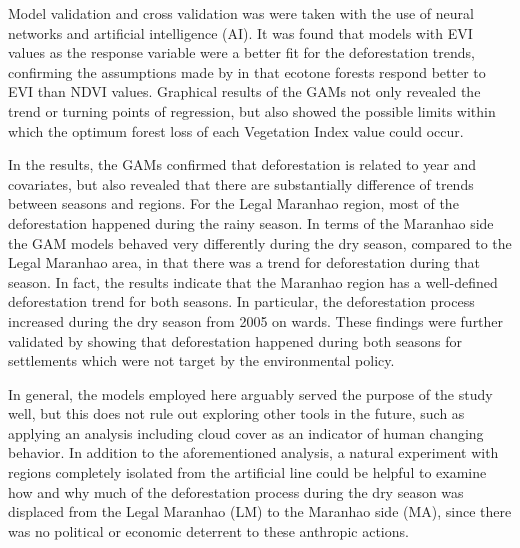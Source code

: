 Model validation and cross validation was were taken with the use of neural networks and artificial intelligence (AI). It was found that models with EVI values as the response variable were a better fit for the deforestation trends, confirming the assumptions made by \citet{ratana_huete_ferreira_2005,bayma_sano_2015,didan_munoz_2015} in that ecotone forests respond better to EVI than NDVI values. Graphical results of the GAMs not only revealed the trend or turning points of regression, but also showed the possible limits within which the optimum forest loss of each Vegetation Index value could occur. 

In the results, the GAMs confirmed that deforestation is related to year and covariates, but also revealed that there are substantially difference of trends between seasons and regions. For the Legal Maranhao region, most of the deforestation happened during the rainy season. In terms of the Maranhao side the GAM models behaved very differently during the dry season, compared to the Legal Maranhao area, in that there was a trend for deforestation during that season. In fact, the results indicate that the Maranhao region has a well-defined deforestation trend for both seasons. In particular, the deforestation process increased during the dry season from 2005 on wards. These findings were further validated by showing that deforestation happened during both seasons for settlements which were not target by the environmental policy.

In general, the models employed here arguably served the purpose of the study well, but this does not rule out exploring other tools in the future, such as applying an analysis including cloud cover as an indicator of human changing behavior. In addition to the aforementioned analysis, a natural experiment with regions completely isolated from the artificial line could be helpful to examine how and why much of the deforestation process during the dry season was displaced from the Legal Maranhao (LM) to the Maranhao side (MA), since there was no political or economic deterrent to these anthropic actions. 

